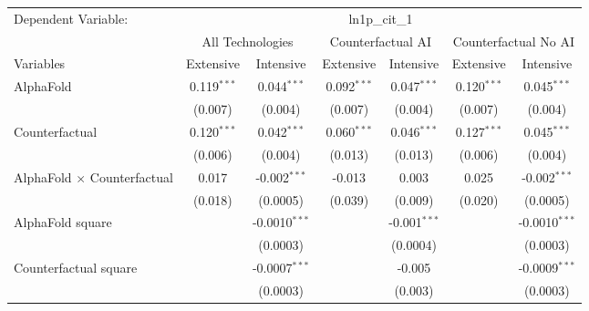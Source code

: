 \begingroup
\centering
\begin{tabular}{lcccccc}
   \tabularnewline \midrule \midrule
   Dependent Variable: & \multicolumn{6}{c}{ln1p\_cit\_1}\\
 & \multicolumn{2}{c}{All Technologies} & \multicolumn{2}{c}{Counterfactual AI} & \multicolumn{2}{c}{Counterfactual No AI} \\
\cmidrule(lr){1-1}\cmidrule(lr){2-3} \cmidrule(lr){4-5} \cmidrule(lr){6-7}
Variables & \multicolumn{1}{c}{Extensive} & \multicolumn{1}{c}{Intensive} & \multicolumn{1}{c}{Extensive} & \multicolumn{1}{c}{Intensive} & \multicolumn{1}{c}{Extensive} & \multicolumn{1}{c}{Intensive} \\
\cmidrule(lr){1-1}\cmidrule(lr){2-2} \cmidrule(lr){3-3} \cmidrule(lr){4-4} \cmidrule(lr){5-5} \cmidrule(lr){6-6} \cmidrule(lr){7-7}
   AlphaFold                          & 0.119$^{***}$ & 0.044$^{***}$     & 0.092$^{***}$ & 0.047$^{***}$  & 0.120$^{***}$ & 0.045$^{***}$\\   
                                      & (0.007)       & (0.004)           & (0.007)       & (0.004)        & (0.007)       & (0.004)\\   
   Counterfactual                     & 0.120$^{***}$ & 0.042$^{***}$     & 0.060$^{***}$ & 0.046$^{***}$  & 0.127$^{***}$ & 0.045$^{***}$\\   
                                      & (0.006)       & (0.004)           & (0.013)       & (0.013)        & (0.006)       & (0.004)\\   
   AlphaFold $\times$ Counterfactual  & 0.017         & -0.002$^{***}$    & -0.013        & 0.003          & 0.025         & -0.002$^{***}$\\   
                                      & (0.018)       & (0.0005)          & (0.039)       & (0.009)        & (0.020)       & (0.0005)\\   
   AlphaFold square                   &               & -0.0010$^{***}$   &               & -0.001$^{***}$ &               & -0.0010$^{***}$\\   
                                      &               & (0.0003)          &               & (0.0004)       &               & (0.0003)\\   
   Counterfactual square              &               & -0.0007$^{***}$   &               & -0.005         &               & -0.0009$^{***}$\\   
                                      &               & (0.0003)          &               & (0.003)        &               & (0.0003)\\   

\end{tabular}
